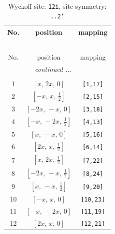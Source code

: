 \documentclass[fleqn,8pt]{jsarticle}
\begin{document}
\begin{longtable}{ccc}
\caption{Wyckoff site: {\tt 12i}, site symmetry: {\tt ..2'}}
 \\
 \hline \hline
No. & position & mapping \\ \hline \endfirsthead

\multicolumn{2}{l}{\tablename\ \thetable{}} \\
 \hline \hline
No. & position & mapping \\ \hline \endhead

 \hline \hline
\multicolumn{2}{r}{\footnotesize\it continued ...} \\ \endfoot

 \hline \hline
\multicolumn{2}{r}{} \\ \endlastfoot

1 & $\left[ x,\, 2 x,\, 0 \right]$ & {\tt [1,17]} \\ \hline
2 & $\left[ - x,\, x,\, \frac{1}{2} \right]$ & {\tt [2,15]} \\ \hline
3 & $\left[ - 2 x,\, - x,\, 0 \right]$ & {\tt [3,18]} \\ \hline
4 & $\left[ - x,\, - 2 x,\, \frac{1}{2} \right]$ & {\tt [4,13]} \\ \hline
5 & $\left[ x,\, - x,\, 0 \right]$ & {\tt [5,16]} \\ \hline
6 & $\left[ 2 x,\, x,\, \frac{1}{2} \right]$ & {\tt [6,14]} \\ \hline
7 & $\left[ x,\, 2 x,\, \frac{1}{2} \right]$ & {\tt [7,22]} \\ \hline
8 & $\left[ - 2 x,\, - x,\, \frac{1}{2} \right]$ & {\tt [8,24]} \\ \hline
9 & $\left[ x,\, - x,\, \frac{1}{2} \right]$ & {\tt [9,20]} \\ \hline
10 & $\left[ - x,\, x,\, 0 \right]$ & {\tt [10,23]} \\ \hline
11 & $\left[ - x,\, - 2 x,\, 0 \right]$ & {\tt [11,19]} \\ \hline
12 & $\left[ 2 x,\, x,\, 0 \right]$ & {\tt [12,21]} \\
\end{longtable}
\renewcommand{\arraystretch}{1.2}
\end{document}
